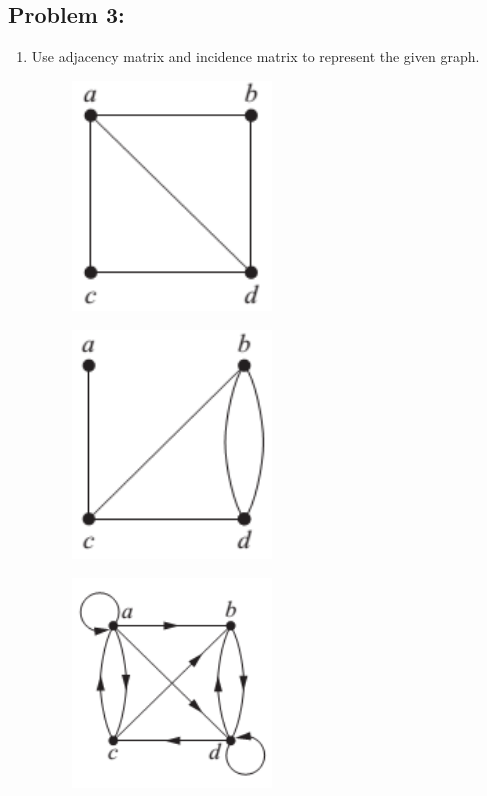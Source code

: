 \documentclass[12pt,en,a4paper]{article}
\begin{document}
	\subsection*{Problem 3:}
	\begin{enumerate}
		\item Use adjacency matrix and incidence matrix to represent the given graph.
		\begin{figure}[ht]
			\begin{minipage}{0.3\textwidth}
				\includegraphics[width=0.5\textwidth]{gprob3_1.png}
				\label{fig:gprob3_1}
			\end{minipage}
			\begin{minipage}{0.3\textwidth}
				\includegraphics[width=0.5\textwidth]{gprob3_2.png}
				\label{fig:gprob3_2}
			\end{minipage}
			\begin{minipage}{0.3\textwidth}
				\includegraphics[width=0.5\textwidth]{gprob3_3.png}

\end{minipage}
\end{figure}
\end{enumerate}
\end{document}
